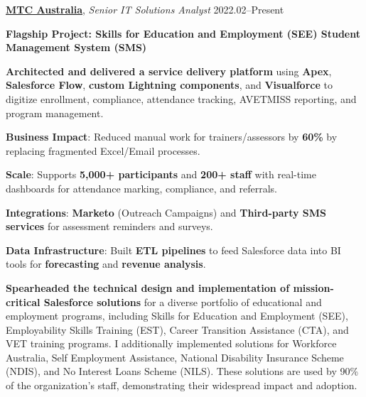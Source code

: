 \documentclass[11pt,article,oneside]{memoir}
\begin{document}
\bigskip

\vspace{0.5em}

\ind \textbf{\href{https://mtcaustralia.com.au/}{MTC Australia}}, \emph{Senior IT Solutions Analyst} \hfill 2022.02--Present

\ind \textbf{Flagship Project: Skills for Education and Employment (SEE) Student Management System (SMS)}

\ind \hspace{0.35in} \textbf{Architected and delivered a service delivery platform} using \textbf{Apex}, \textbf{Salesforce Flow}, \textbf{custom Lightning components}, and \textbf{Visualforce} to digitize enrollment, compliance, attendance tracking, AVETMISS reporting, and program management.

\ind \hspace{0.35in} \textbf{Business Impact}: Reduced manual work for trainers/assessors by \textbf{60\%} by replacing fragmented Excel/Email processes.

\ind \hspace{0.35in} \textbf{Scale}: Supports \textbf{5,000+ participants} and \textbf{200+ staff} with real-time dashboards for attendance marking, compliance, and referrals.

\ind \hspace{0.35in} \textbf{Integrations}: \textbf{Marketo} (Outreach Campaigns) and \textbf{Third-party SMS services} for assessment reminders and surveys.

\ind \hspace{0.35in} \textbf{Data Infrastructure}: Built \textbf{ETL pipelines} to feed Salesforce data into BI tools for \textbf{forecasting} and \textbf{revenue analysis}.

\ind \textbf{Spearheaded the technical design and implementation of mission-critical Salesforce solutions} for a diverse portfolio of educational and employment programs, including Skills for Education and Employment (SEE), Employability Skills Training (EST), Career Transition Assistance (CTA), and VET training programs. I additionally implemented solutions for Workforce Australia, Self Employment Assistance, National Disability Insurance Scheme (NDIS), and No Interest Loans Scheme (NILS). These solutions are used by 90\% of the organization's staff, demonstrating their widespread impact and adoption.

\bigskip
\end{document}
